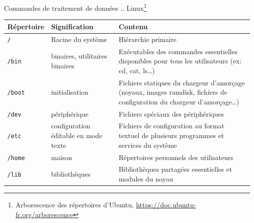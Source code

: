 \documentclass{beamer}
\begin{document}
    \begin{frame}{Commandes de traitement de données}{ ..
    Linux\footnote{\label{arborescence-linux}Arborescence des répertoires d’Ubuntu, \url{https://doc.ubuntu-fr.org/arborescence}}}
        \begin{tiny}
            \begin{table}[h!]
                \centering
                \begin{tabular}{|l|p{3cm}|p{6cm}|}
                    \hline
                    \textbf{Répertoire} & \textbf{Signification}               & \textbf{Contenu}                                                                                                               \\
                    \hline
                    \lstinline{/}       & Racine du système                    & Hiérarchie primaire                                                                                                            \\
                    \hline
                    \lstinline{/bin}    & binaires, utilitaires binaires       & Exécutables des commandes essentielles disponibles pour tous les utilisateurs (ex: cd, cat, ls…)                               \\
                    \hline
                    \lstinline{/boot}   & initialisation                       & Fichiers statiques du chargeur d’amorçage (noyaux, images ramdisk, fichiers de configuration du chargeur d'amorçage…)          \\
                    \hline
                    \lstinline{/dev}    & périphérique                         & Fichiers spéciaux des périphériques                                                                                            \\
                    \hline
                    \lstinline{/etc}    & configuration éditable en mode texte & Fichiers de configuration au format textuel de plusieurs programmes et services du système                                     \\
                    \hline
                    \lstinline{/home}   & maison                               & Répertoires personnels des utilisateurs                                                                                        \\
                    \hline
                    \lstinline{/lib}    & bibliothèques                        & Bibliothèques partagées essentielles et modules du noyau                                                                       \\

\end{tabular}
\end{table}
\end{tiny}
\end{frame}
\end{document}
